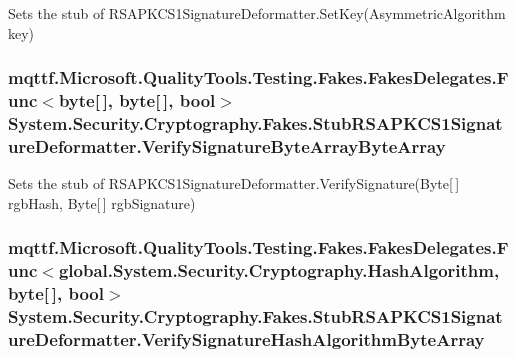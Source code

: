 Sets the stub of R\-S\-A\-P\-K\-C\-S1\-Signature\-Deformatter.\-Set\-Key(\-Asymmetric\-Algorithm key)

\hypertarget{class_system_1_1_security_1_1_cryptography_1_1_fakes_1_1_stub_r_s_a_p_k_c_s1_signature_deformatter_a86a3975cb2f3925e59f1261f25743e9b}{
\subsubsection[{Verify\-Signature\-Byte\-Array\-Byte\-Array}]{\setlength{\rightskip}{0pt plus 5cm}mqttf.\-Microsoft.\-Quality\-Tools.\-Testing.\-Fakes.\-Fakes\-Delegates.\-Func$<$byte\mbox{[}$\,$\mbox{]}, byte\mbox{[}$\,$\mbox{]}, bool$>$ System.\-Security.\-Cryptography.\-Fakes.\-Stub\-R\-S\-A\-P\-K\-C\-S1\-Signature\-Deformatter.\-Verify\-Signature\-Byte\-Array\-Byte\-Array}}\label{class_system_1_1_security_1_1_cryptography_1_1_fakes_1_1_stub_r_s_a_p_k_c_s1_signature_deformatter_a86a3975cb2f3925e59f1261f25743e9b}


Sets the stub of R\-S\-A\-P\-K\-C\-S1\-Signature\-Deformatter.\-Verify\-Signature(\-Byte\mbox{[}$\,$\mbox{]} rgb\-Hash, Byte\mbox{[}$\,$\mbox{]} rgb\-Signature)

\hypertarget{class_system_1_1_security_1_1_cryptography_1_1_fakes_1_1_stub_r_s_a_p_k_c_s1_signature_deformatter_a0e2831457b5c362a2102aae6679ce7e7}{
\subsubsection[{Verify\-Signature\-Hash\-Algorithm\-Byte\-Array}]{\setlength{\rightskip}{0pt plus 5cm}mqttf.\-Microsoft.\-Quality\-Tools.\-Testing.\-Fakes.\-Fakes\-Delegates.\-Func$<$global.\-System.\-Security.\-Cryptography.\-Hash\-Algorithm, byte\mbox{[}$\,$\mbox{]}, bool$>$ System.\-Security.\-Cryptography.\-Fakes.\-Stub\-R\-S\-A\-P\-K\-C\-S1\-Signature\-Deformatter.\-Verify\-Signature\-Hash\-Algorithm\-Byte\-Array}}\label{class_system_1_1_security_1_1_cryptography_1_1_fakes_1_1_stub_r_s_a_p_k_c_s1_signature_deformatter_a0e2831457b5c362a2102aae6679ce7e7}


